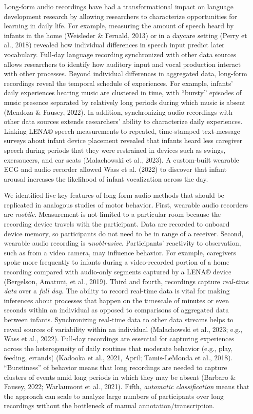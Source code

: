 \documentclass[
  man]{apa6}
\begin{document}
Long-form audio recordings have had a transformational impact on language development research by allowing researchers to characterize opportunities for learning in daily life. For example, measuring the amount of speech heard by infants in the home (Weisleder \& Fernald, 2013) or in a daycare setting (Perry et al., 2018) revealed how individual differences in speech input predict later vocabulary. Full-day language recording synchronized with other data sources allows researchers to identify how auditory input and vocal production interact with other processes. Beyond individual differences in aggregated data, long-form recordings reveal the temporal schedule of experiences. For example, infants' daily experiences hearing music are clustered in time, with ``bursty'' episodes of music presence separated by relatively long periods during which music is absent (Mendoza \& Fausey, 2022). In addition, synchronizing audio recordings with other data sources extends researchers' ability to characterize daily experiences. Linking LENA® speech measurements to repeated, time-stamped text-message surveys about infant device placement revealed that infants heard less caregiver speech during periods that they were restrained in devices such as swings, exersaucers, and car seats (Malachowski et al., 2023). A custom-built wearable ECG and audio recorder allowed Wass et al. (2022) to discover that infant arousal increases the likelihood of infant vocalization across the day.

We identified five key features of long-form audio methods that should be replicated in analogous studies of motor behavior. First, wearable audio recorders are \emph{mobile}. Measurement is not limited to a particular room because the recording device travels with the participant. Data are recorded to onboard device memory, so participants do not need to be in range of a receiver. Second, wearable audio recording is \emph{unobtrusive}. Participants' reactivity to observation, such as from a video camera, may influence behavior. For example, caregivers spoke more frequently to infants during a video-recorded portion of a home recording compared with audio-only segments captured by a LENA® device (Bergelson, Amatuni, et al., 2019). Third and fourth, recordings capture \emph{real-time data} over a \emph{full day}. The ability to record real-time data is vital for making inferences about processes that happen on the timescale of minutes or even seconds within an individual as opposed to comparisons of aggregated data between infants. Synchronizing real-time data to other data streams helps to reveal sources of variability within an individual (Malachowski et al., 2023; e.g., Wass et al., 2022). Full-day recordings are essential for capturing experiences across the heterogeneity of daily routines that moderate behavior (e.g., play, feeding, errands) (Kadooka et al., 2021, April; Tamis-LeMonda et al., 2018). ``Burstiness'' of behavior means that long recordings are needed to capture clusters of events amid long periods in which they may be absent (Barbaro \& Fausey, 2022; Warlaumont et al., 2021). Fifth, \emph{automatic classification} means that the approach can scale to analyze large numbers of participants over long recordings without the bottleneck of manual annotation/transcription.
\end{document}
